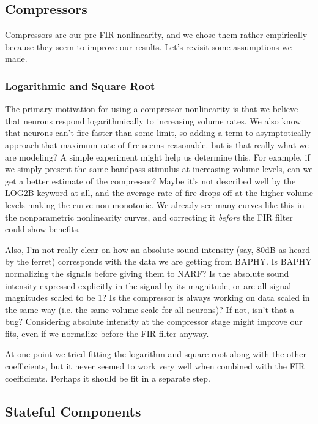 \documentclass[11pt]{article}
\begin{document}
\subsection{Compressors}
\label{sec-2.3}


   Compressors are our pre-FIR nonlinearity, and we chose them rather empirically because they seem to improve our results. Let's revisit some assumptions we made.
   
\subsubsection{Logarithmic and Square Root}
\label{sec-2.3.1}


   The primary motivation for using a compressor nonlinearity is that we believe that neurons respond logarithmically to increasing volume rates. We also know that neurons can't fire faster than some limit, so adding a term to asymptotically approach that maximum rate of fire seems reasonable. but is that really what we are modeling? A simple experiment might help us determine this. For example, if we simply present the same bandpass stimulus at increasing volume levels, can we get a better estimate of the compressor? Maybe it's not described well by the LOG2B keyword at all, and the average rate of fire drops off at the higher volume levels making the curve non-monotonic. We already see many curves like this in the nonparametric nonlinearity curves, and correcting it \emph{before} the FIR filter could show benefits.
   
   Also, I'm not really clear on how an absolute sound intensity (say, 80dB as heard by the ferret) corresponds with the data we are getting from BAPHY. Is BAPHY normalizing the signals before giving them to NARF? Is the absolute sound intensity expressed explicitly in the signal by its magnitude, or are all signal magnitudes scaled to be 1? Is the compressor is always working on data scaled in the same way (i.e. the same volume scale for all neurons)? If not, isn't that a bug? Considering absolute intensity at the compressor stage might improve our fits, even if we normalize before the FIR filter anyway.

   At one point we tried fitting the logarithm and square root along with the other coefficients, but it never seemed to work very well when combined with the FIR coefficients. Perhaps it should be fit in a separate step.

\subsection{Stateful Components}
\label{sec-2.4}
\end{document}
